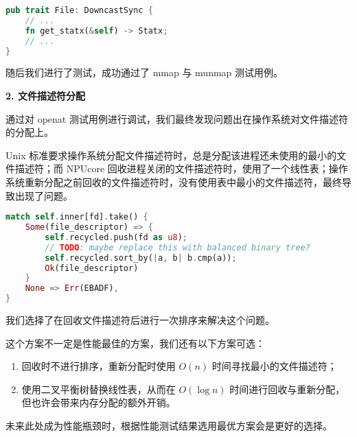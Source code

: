 \begin{lstlisting}[language={Rust}, caption={statx 系统调用实现}]
pub trait File: DowncastSync {
    // ...
    fn get_statx(&self) -> Statx;
    // ...
}
\end{lstlisting}

随后我们进行了测试，成功通过了 mmap 与 munmap 测试用例。

\textbf{2. 文件描述符分配}

通过对 openat 测试用例进行调试，我们最终发现问题出在操作系统对文件描述符的分配上。

Unix 标准要求操作系统分配文件描述符时，总是分配该进程还未使用的最小的文件描述符；而 NPUcore 回收进程关闭的文件描述符时，使用了一个线性表；操作系统重新分配之前回收的文件描述符时，没有使用表中最小的文件描述符，最终导致出现了问题。

\begin{lstlisting}[language={Rust}, caption={回收文件描述符}]
match self.inner[fd].take() {
    Some(file_descriptor) => {
        self.recycled.push(fd as u8);
        // TODO: maybe replace this with balanced binary tree?
        self.recycled.sort_by(|a, b| b.cmp(a));
        Ok(file_descriptor)
    }
    None => Err(EBADF),
}
\end{lstlisting}

我们选择了在回收文件描述符后进行一次排序来解决这个问题。

这个方案不一定是性能最佳的方案，我们还有以下方案可选：

\begin{enumerate}
    \item 回收时不进行排序，重新分配时使用 $O(n)$ 时间寻找最小的文件描述符；
    \item 使用二叉平衡树替换线性表，从而在 $O(\log n)$ 时间进行回收与重新分配，但也许会带来内存分配的额外开销。
\end{enumerate}

未来此处成为性能瓶颈时，根据性能测试结果选用最优方案会是更好的选择。
